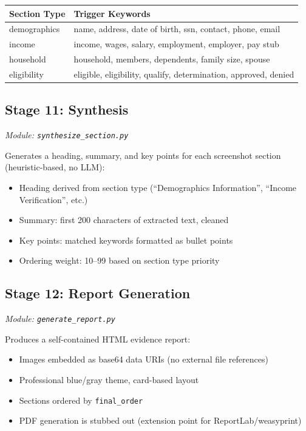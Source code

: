 \documentclass[12pt, a4paper]{article}
\newcommand{\codeinline}[1]{\texttt{\small\colorbox{codebg}{#1}}}
\newcommand{\filepath}[1]{\texttt{\small #1}}
\begin{document}
\begin{tabularx}{\textwidth}{@{} l X @{}}
    \toprule
    \textbf{Section Type} & \textbf{Trigger Keywords} \\
    \midrule
    demographics & name, address, date of birth, ssn, contact, phone, email \\
    income & income, wages, salary, employment, employer, pay stub \\
    household & household, members, dependents, family size, spouse \\
    eligibility & eligible, eligibility, qualify, determination, approved, denied \\
    \bottomrule
\end{tabularx}

\subsection{Stage 11: Synthesis}
\textit{Module: \filepath{synthesize\_section.py}}

Generates a heading, summary, and key points for each screenshot section (heuristic-based, no LLM):
\begin{itemize}
    \item Heading derived from section type (``Demographics Information'', ``Income Verification'', etc.)
    \item Summary: first 200 characters of extracted text, cleaned
    \item Key points: matched keywords formatted as bullet points
    \item Ordering weight: 10--99 based on section type priority
\end{itemize}

\subsection{Stage 12: Report Generation}
\textit{Module: \filepath{generate\_report.py}}

Produces a self-contained HTML evidence report:
\begin{itemize}
    \item Images embedded as base64 data URIs (no external file references)
    \item Professional blue/gray theme, card-based layout
    \item Sections ordered by \codeinline{final\_order}
    \item PDF generation is stubbed out (extension point for ReportLab/weasyprint)
\end{itemize}
\end{document}
